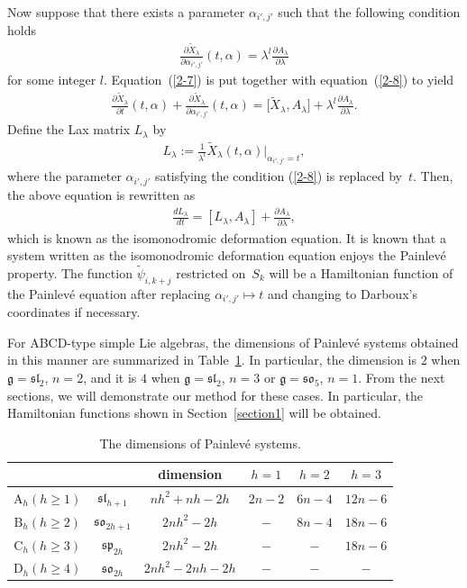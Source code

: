 \documentclass[pdftex]{sigma}
\numberwithin{equation}{section}
\begin{document}
Now suppose that there exists a parameter $\alpha _{i',j'}$ such that the following condition holds
\begin{gather}
\frac{\partial \widetilde{X}_\lambda }{\partial \alpha _{i',j'}}(t, \alpha ) = \lambda ^l \frac{\partial A_\lambda }{\partial \lambda}\label{2-8}
\end{gather}
for some integer $l$. Equation~(\ref{2-7}) is put together with equation~(\ref{2-8}) to yield
\begin{gather*}
\frac{\partial \widetilde{X}_\lambda}{\partial t}(t,\alpha ) + \frac{\partial \widetilde{X}_\lambda }{\partial \alpha _{i',j'}}(t, \alpha )
 = \big[\widetilde{X}_\lambda , A_\lambda \big]+\lambda ^l \frac{\partial A_\lambda }{\partial \lambda }.
\end{gather*}
Def\/ine the Lax matrix $L_\lambda $ by
\begin{gather*}
L_\lambda := \frac{1}{\lambda ^l} \widetilde{X}_\lambda (t, \alpha )|_{\alpha _{i',j'} = t},
\end{gather*}
where the parameter $\alpha _{i',j'}$ satisfying the condition (\ref{2-8}) is replaced by~$t$. Then, the above equation is rewritten as
\begin{gather}
\frac{dL_\lambda}{dt} = [L_\lambda , A_\lambda ]+\frac{\partial A_\lambda }{\partial \lambda },
\label{2-9}
\end{gather}
which is known as the isomonodromic deformation equation. It is known that a system written as the isomonodromic deformation equation enjoys the Painlev\'{e} property. The function $\widetilde{\psi}_{i,k+j}$ restricted on~$S_k$ will be a Hamiltonian function of the Painlev\'{e} equation after replacing $\alpha _{i',j'} \mapsto t$ and changing to Darboux's coordinates if necessary.

For ABCD-type simple Lie algebras, the dimensions of Painlev\'{e} systems obtained in this manner are summarized in Table~\ref{table3}. In particular, the dimension is $2$ when $\mathfrak{g} = \mathfrak{sl}_2$, $n=2$, and it is $4$ when $\mathfrak{g} = \mathfrak{sl}_2$, $n=3$ or $\mathfrak{g} = \mathfrak{so}_5$, $n=1$. From the next sections, we will demonstrate our method for these cases. In particular, the Hamiltonian functions shown in Section~\ref{section1} will be obtained.

\begin{table}[h]\centering\caption{The dimensions of Painlev\'{e} systems.}\label{table3}\vspace{1mm}
\begin{tabular}{|c|c|c|c|c|c|} \hline
& & dimension & $h=1$ & $h=2$ & $h=3$\\ \hline \hline
$\text{A}_h (h\geq 1)$ & $\mathfrak{sl}_{h+1}$ & $nh^2+nh-2h$ & $2n-2$ & $6n-4$ & $12n-6$ \\ \hline
$\text{B}_h (h\geq 2)$ & $\mathfrak{so}_{2h+1}$& $2nh^2-2h$ & $-$ & $8n-4$ & $18n-6$\\ \hline
$\text{C}_h (h\geq 3)$ & $\mathfrak{sp}_{2h}$ & $2nh^2-2h$ & $-$ & $-$ & $18n-6$ \\ \hline
$\text{D}_h (h\geq 4)$ & $\mathfrak{so}_{2h}$ & $2nh^2-2nh-2h$ & $-$ & $-$ & $-$ \\ \hline
\end{tabular}
\end{table}
\end{document}

